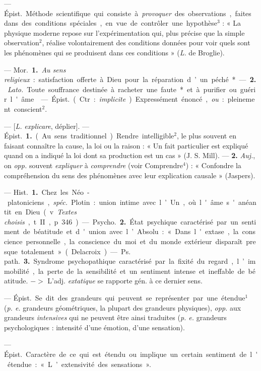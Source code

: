 \begin{itemize}[leftmargin=1cm, label=, itemsep=1pt]
 — \si{Épist.} Méthode
scientifique qui consiste à {\it provoquer}
des observations, faites dans des conditions spéciales, en vue de contrôler
une hypothèse$^3$ : « La physique
moderne repose sur l'expérimentation qui, plus précise que la
simple observation$^2$, réalise volontairement des conditions données
pour voir quels sont les phénomènes
qui se produisent dans ces conditions » ({\it L.} de Broglie).

 — \si{Mor.} {\bf 1.} {\it Au sens religieux} : satisfaction
offerte à Dieu pour la réparation d’un péché*.

— {\bf 2.} {\it Lato.} Toute souffrance destinée à racheter une faute* et à
purifier ou guérir l'âme.

 — \si{Épist.} (Ctr. : {\it implicite}).
Expressément énoncé, {\it ou} : pleinement conscient$^2$.

 — [{\it L.} {\it explicare}, déplier]. —
\si{Épist.} {\bf 1.} (Au sens traditionnel).
Rendre intelligible$^2$, le plus souvent
en faisant connaître la cause, la loi
ou la raison : « Un fait particulier est
expliqué quand on a indiqué la loi
dont sa production est un cas »
(J. S. Mill). — {\bf 2.} {\it Auj.}, on {\it opp.} souvent {\it expliquer}
à {\it comprendre} (voir Comprendre$^4$) : « Confondre la
compréhension du sens des phénomènes avec leur explication causale »
(Jaspers).

 — \si{Hist.} {\bf 1.} Chez les Néo-platoniciens, {\it spéc.}
Plotin : union intime avec l’Un, où l'âme s'anéantit en
Dieu (v. {\it Textes choisis}, t. II, p. 346).
— \si{Psycho.} {\bf 2.} État psychique caractérisé par un sentiment
de béatitude et d'union avec l’Absolu : « Dans
l'extase, la conscience personnelle, la conscience du moi et du monde
extérieur disparaît presque totalement » (Delacroix). — \si{Ps. path.}
{\bf 3.} Syndrome psychopathique caractérisé par la fixité du regard, l’immobilité, la perte de la sensibilité et un sentiment intense et ineffable
de béatitude. $->$ L'adj. {\it extatique} se rapporte gén. à ce dernier sens.

 — \si{Épist.} Se dit des grandeurs qui peuvent se représenter par
une étendue$^1$ ({\it p. e.} grandeurs géométriques, la plupart des grandeurs
physiques), {\it opp.} aux grandeurs {\it intensives} qui ne peuvent être
ainsi traduites ({\it p. e.} grandeurs psychologiques : intensité d'une
émotion, d’une sensation).

 — \si{Épist.} Caractère de ce
qui est étendu ou implique un certain
sentiment de l'étendue : « L’extensivité des sensations ».


\end{itemize}
